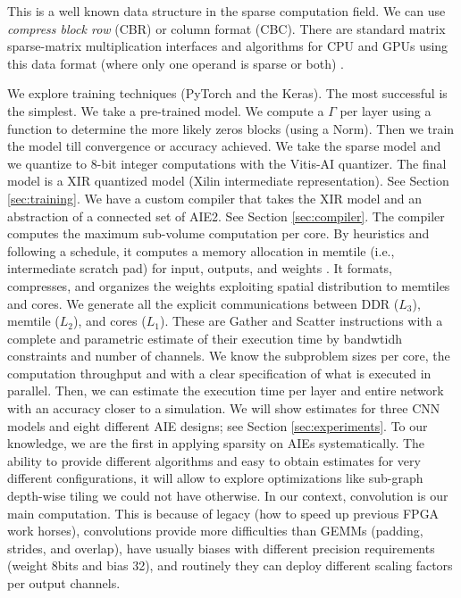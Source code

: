 \documentclass{IEEEtran}
\begin{document}
This is a well known data structure in the sparse computation field.
We can use {\em compress block row} (CBR) or {\em }column format
(CBC). There are standard matrix sparse-matrix multiplication
interfaces and algorithms for CPU and GPUs using this data format
(where only one operand is sparse or both) \cite{rocSPARSE,cuSPARSE}.

We explore training techniques (PyTorch and the Keras).  The most
successful is the simplest. We take a pre-trained model. We compute a
$\Gamma$ per layer using a function to determine the more likely zeros
blocks (using a Norm). Then we train the model till convergence or
accuracy achieved. We take the sparse model and we quantize to 8-bit
integer computations with the Vitis-AI quantizer. The final model is a
XIR quantized model (Xilin intermediate representation). See Section
\ref{sec:training}. We have a custom compiler that takes the XIR model
and an abstraction of a connected set of AIE2. See Section
\ref{sec:compiler}. The compiler computes the maximum sub-volume
computation per core. By heuristics and following a schedule, it
computes a memory allocation in memtile (i.e., intermediate scratch
pad) for input, outputs, and weights . It formats, compresses, and
organizes the weights exploiting spatial distribution to memtiles and
cores. We generate all the explicit communications between DDR
($L_3$), memtile ($L_2$), and cores ($L_1$). These are Gather and
Scatter instructions with a complete and parametric estimate of their
execution time by bandwtidh constraints and number of channels. We
know the subproblem sizes per core, the computation throughput and
with a clear specification of what is executed in parallel. Then, we
can estimate the execution time per layer and entire network with an
accuracy closer to a simulation.  We will show estimates for three CNN
models and eight different AIE designs; see Section
\ref{sec:experiments}. To our knowledge, we are the first in applying
sparsity on AIEs systematically. The ability to provide different
algorithms and easy to obtain estimates for very different
configurations, it will allow to explore optimizations like sub-graph
depth-wise tiling we could not have otherwise. In our context,
convolution is our main computation. This is because of legacy (how to
speed up previous FPGA work horses), convolutions provide more
difficulties than GEMMs (padding, strides, and overlap), have usually
biases with different precision requirements (weight 8bits and bias
32), and routinely they can deploy different scaling factors per
output channels.
\end{document}
